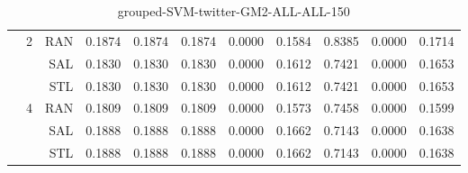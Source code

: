 \begin{center}
\begin{table}[htbp]
\begin{center}
\begin{tabular}{ | r | r | r | r | r | r | r | r | r | r | r |}
 & \multirow{3}{*}{2} & RAN & 0.1874 & 0.1874 & 0.1874 & 0.0000 & 0.1584 & 0.8385 & 0.0000 & 0.1714\\ \cline{3-11}
 &   & SAL & 0.1830 & 0.1830 & 0.1830 & 0.0000 & 0.1612 & 0.7421 & 0.0000 & 0.1653\\ \cline{3-11}
 &   & STL & 0.1830 & 0.1830 & 0.1830 & 0.0000 & 0.1612 & 0.7421 & 0.0000 & 0.1653\\ \cline{2-11}
 & \multirow{3}{*}{4} & RAN & 0.1809 & 0.1809 & 0.1809 & 0.0000 & 0.1573 & 0.7458 & 0.0000 & 0.1599\\ \cline{3-11}
 &   & SAL & 0.1888 & 0.1888 & 0.1888 & 0.0000 & 0.1662 & 0.7143 & 0.0000 & 0.1638\\ \cline{3-11}
 &   & STL & 0.1888 & 0.1888 & 0.1888 & 0.0000 & 0.1662 & 0.7143 & 0.0000 & 0.1638\\ \cline{2-11}
\hline
\end{tabular}
\caption{grouped-SVM-twitter-GM2-ALL-ALL-150}
\end{center}
 \end{table}
\end{center}

